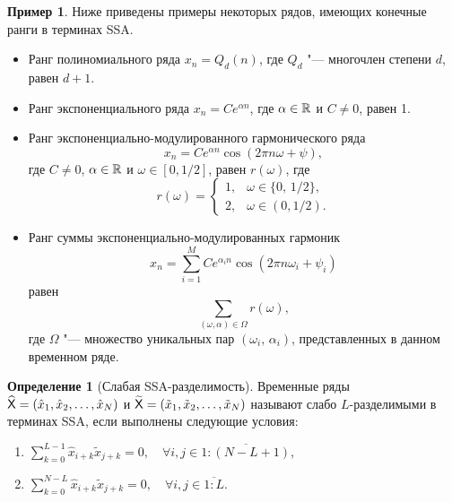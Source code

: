 \documentclass[specialist,
    substylefile = spbu.rtx,
    subf,href,colorlinks=true, 12pt]{disser}
\theoremstyle{plain}
\theoremstyle{definition}
\newtheorem{definition}{Определение}[section]
\newtheorem{example}{Пример}[section]
\theoremstyle{remark}
\begin{document}
    \begin{example}
        \label{ex:ssa-ranks}
        Ниже приведены примеры некоторых рядов, имеющих конечные ранги в терминах SSA.
        \begin{itemize}
            \item Ранг полиномиального ряда $x_n = Q_d(n)$, где $Q_d$ "--- многочлен степени $d$, равен $d + 1$.
            \item Ранг экспоненциального ряда $x_n = C e^{\alpha n}$, где $\alpha \in \mathbb{R}$ и $C \ne 0$, равен 1.
            \item Ранг экспоненциально-модулированного гармонического ряда 
            \[
                x_n = C e^{\alpha n}\cos(2 \pi n \omega + \psi),
            \]
            где $C \ne 0$, $\alpha \in \mathbb{R}$ и $\omega \in [0,1/2]$,
            равен $r(\omega)$, где
            \begin{equation}
                \label{eq:cos-rank}
                r(\omega) =
                \begin{cases}
                    1, & \omega \in \{0,\, 1/2\},\\
                    2, & \omega \in (0, 1/2).    
                \end{cases}
            \end{equation}
            \item Ранг суммы экспоненциально-модулированных гармоник 
            \[
                x_n = \sum_{i=1}^{M} C e^{\alpha_i n}\cos(2 \pi n \omega_i + \psi_i)
            \] 
            равен
            \begin{equation*}
                \label{eq:cos-sum-rank}
                \sum_{(\omega, \alpha)\in \Omega} r(\omega),
            \end{equation*}
            где $\Omega$ "--- множество уникальных пар $(\omega_i,\, \alpha_i)$, представленных в данном временном ряде.
        \end{itemize}
    \end{example}
    
    \begin{definition}[Слабая SSA-разделимость]
        \label{def:ssa-separability}
        Временные ряды $\widehat{\mathsf{X}} = (\hat{x}_1, \hat{x}_2, \ldots, \hat{x}_N)$ и
        $\widetilde{\mathsf{X}} = (\tilde{x}_1, \tilde{x}_2, \ldots, \tilde{x}_N)$ называют слабо $L$-разделимыми в терминах
        SSA, если выполнены следующие условия:
        \begin{enumerate}
            \item $\displaystyle \sum_{k=0}^{L - 1} \hat{x}_{i + k}\tilde{x}_{j + k} = 0,
            \quad \forall i, j \in \overline{1:(N - L + 1)}$,
            \item $\displaystyle \sum_{k=0}^{N - L} \hat{x}_{i + k}\tilde{x}_{j + k} = 0,
            \quad \forall i, j \in \overline{1:L}$.
        \end{enumerate}
    \end{definition}
    
\end{document}
